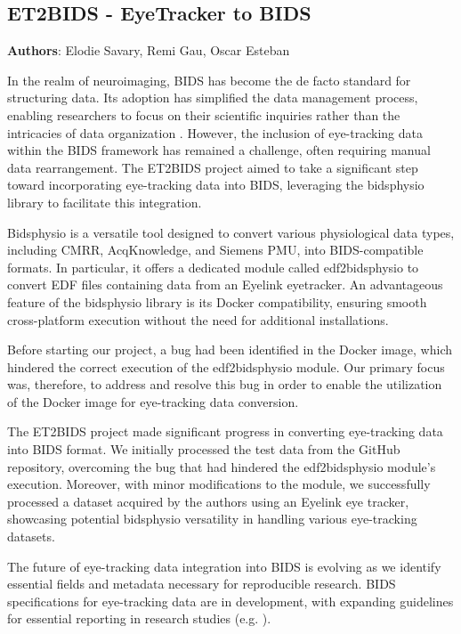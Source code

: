 \documentclass{article}
\begin{document}
\subsection{ET2BIDS - EyeTracker to BIDS}
\textbf{Authors}: Elodie Savary, Remi Gau, Oscar Esteban

In the realm of neuroimaging, BIDS has become the de facto standard for structuring data. Its adoption has simplified the data management process, enabling researchers to focus on their scientific inquiries rather than the intricacies of data organization \cite{gorgolewski2016}. However, the inclusion of eye-tracking data within the BIDS framework has remained a challenge, often requiring manual data rearrangement. The ET2BIDS project aimed to take a significant step toward incorporating eye-tracking data into BIDS, leveraging the bidsphysio library to facilitate this integration.

Bidsphysio is a versatile tool designed to convert various physiological data types, including CMRR, AcqKnowledge, and Siemens PMU, into BIDS-compatible formats. In particular, it offers a dedicated module called edf2bidsphysio to convert EDF files containing data from an Eyelink eyetracker. An advantageous feature of the bidsphysio library is its Docker compatibility, ensuring smooth cross-platform execution without the need for additional installations.

Before starting our project, a bug had been identified in the Docker image, which hindered the correct execution of the edf2bidsphysio module. Our primary focus was, therefore, to address and resolve this bug in order to enable the utilization of the Docker image for eye-tracking data conversion.

The ET2BIDS project made significant progress in converting eye-tracking data into BIDS format. We initially processed the test data from the GitHub repository, overcoming the bug that had hindered the edf2bidsphysio module's execution. Moreover, with minor modifications to the module, we successfully processed a dataset acquired by the authors using an Eyelink eye tracker, showcasing potential bidsphysio versatility in handling various eye-tracking datasets.

The future of eye-tracking data integration into BIDS is evolving as we identify essential fields and metadata necessary for reproducible research. BIDS specifications for eye-tracking data are in development, with expanding guidelines for essential reporting in research studies (e.g. \cite{dunn2023}).
\end{document}
